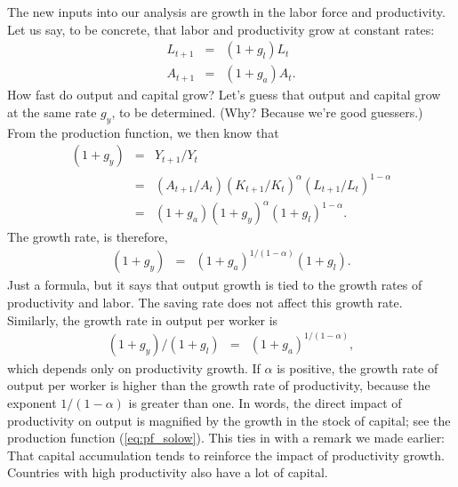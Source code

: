 The new inputs into our analysis are growth in the   labor force 
and productivity.
Let us say, to be concrete,
that labor and productivity grow
at constant rates:
\begin{eqnarray*}
    L_{t+1} &=&  (1+g_l) L_t \\
    A_{t+1} &=&  (1+g_a) A_t .
\end{eqnarray*}
How fast do output and capital grow?
Let's guess that output and capital grow at the same rate $g_y$,
to be determined.
(Why?  Because we're good guessers.)
From the production function, we then know that
\begin{eqnarray*}
    (1+g_y)       &=& Y_{t+1}/Y_t  \\
                &=&  (A_{t+1}/A_t) (K_{t+1}/K_t)^\alpha
                        (L_{t+1}/L_t)^{1-\alpha} \\
                &=& (1+g_a) (1+g_y)^{\alpha} (1+g_l)^{1-\alpha} .
\end{eqnarray*}
The growth rate, is therefore,
\begin{eqnarray*}
    (1+g_y)       &=& (1+g_a)^{1/(1-\alpha)} (1+g_l) .
\end{eqnarray*}
Just a formula, but it says that output growth is tied
to the growth rates of productivity and labor.
The saving rate does not affect this growth rate.
Similarly, the growth rate in output per worker is
\begin{eqnarray*}
    (1+g_y)/(1+g_l)     &=& (1+g_a)^{1/(1-\alpha)} ,
\end{eqnarray*}
which depends only on productivity growth.
If $\alpha$ is positive,
the growth rate of output per worker is
higher than the growth rate of productivity,
because the exponent $ 1/(1-\alpha)$ is greater than one.
In words, the direct impact of productivity on output
is magnified by the growth in the stock of capital;
see the production function (\ref{eq:pf_solow}).
This ties in with a remark we made earlier: That capital accumulation
tends to reinforce the impact of productivity growth.
Countries with high productivity also have a lot of capital.



